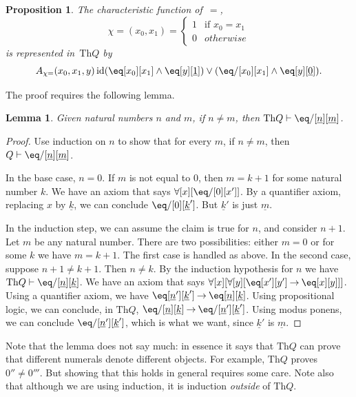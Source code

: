 \documentclass[10pt,a4paper]{article}
\theoremstyle{plain}
\newtheorem{lem}[thm]{Lemma}
\newtheorem{prop}[thm]{Proposition}
\theoremstyle{definition}
\theoremstyle{remark}
\newenvironment{explain}{}{}
\newcommand*{\ollabel}[1]{\label{#1}}
\providecommand{\lif}{\mathbin{\rightarrow}}
\providecommand{\lforall}{\mathord{\forall}}
\providecommand{\Proves}{\mathrel{\vdash}}
\providecommand{\Th}{\ensuremath{\mathrm{Th}}}
\providecommand{\num}[1]{\underline{#1}}
\providecommand{\Char}{\chi}
\providecommand{\ident}{\operatorname{id}}
\begin{document}
\begin{prop}
\ollabel{prop:rep-id}
The characteristic function of~$=$,
\[
\Char{=}(x_0, x_1) =
\begin{cases}
  1 & \text{if } x_0 =x_1\\
  0 & otherwise
\end{cases}
\]
is represented in~$\Th{Q}$ by
\[
  A_{\Char{=}}(x_0, x_1, y) \ident (\eq[x_0][x_1] \land \eq[y][\num{1}]) \lor (\eq/[x_0][x_1] \land
\eq[y][\num{0}]).
\]
\end{prop}

The proof requires the following lemma.

\begin{lem}
\ollabel{lem:q-proves-neq} Given natural numbers $n$ and $m$, if $n
\neq m$, then $\Th{Q} \Proves \eq/[\num n][\num m]$.
\end{lem}

\begin{proof}
Use induction on $n$ to show that for every $m$, if $n \neq m$, then
$Q \Proves \eq/[\num n][\num m]$.

In the base case, $n = 0$. If $m$ is not equal to $0$, then $m = k +
1$ for some natural number $k$. We have an axiom that says
$\lforall[x][\eq/[0][x']]$. By a quantifier axiom, replacing $x$ by
  $\num k$, we can conclude $\eq/[0][\num k']$. But $\num k'$ is just
  $\num m$.

In the induction step, we can assume the claim is true for $n$, and
consider $n+1$. Let $m$ be any natural number. There are two
possibilities: either $m = 0$ or for some $k$ we have $m = k+1$. The
first case is handled as above. In the second case, suppose $n+1 \neq
k+1$. Then $n \neq k$. By the induction hypothesis for $n$ we have
$\Th{Q} \Proves \eq/[\num n][\num k]$. We have an axiom that says
$\lforall[x][\lforall[y][\eq[x'][y'] \lif \eq[x][y]]]$. Using a
quantifier axiom, we have $\eq[\num n'][\num k'] \lif \eq[\num n][\num
  k]$. Using propositional logic, we can conclude, in $\Th{Q}$,
$\eq/[\num n][\num k] \lif \eq/[\num n'][\num k']$. Using modus
ponens, we can conclude $\eq/[\num n'][\num k']$, which is what we want,
since $\num k'$ is $\num m$.
\end{proof}

\begin{explain}
Note that the lemma does not say much: in essence it says that $\Th{Q}$ can
prove that different numerals denote different objects. For example,
$\Th{Q}$ proves $0'' \neq 0'''$. But showing that this holds in general
requires some care. Note also that although we are using induction, it
is induction \emph{outside} of $\Th{Q}$.
\end{explain}
\end{document}
